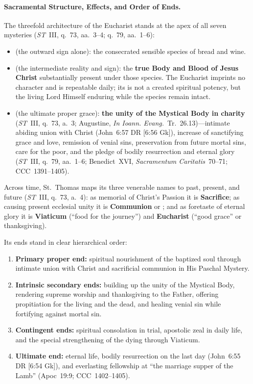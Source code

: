 \paragraph{Sacramental Structure, Effects, and Order of Ends.}
The threefold architecture of the Eucharist stands at the apex of all seven mysteries (\emph{ST}~III, q.~73, aa.~3--4; q.~79, aa.~1--6):
\begin{itemize}
  \item \textbf{} (the outward sign alone): the consecrated sensible species of bread and wine.
  \item \textbf{} (the intermediate reality and sign): the \textbf{true Body and Blood of Jesus Christ} substantially present under those species. The Eucharist imprints no character and is repeatable daily; its  is not a created spiritual potency, but the living Lord Himself enduring while the species remain intact.
  \item \textbf{} (the ultimate proper grace): \textbf{the unity of the Mystical Body in charity} (\emph{ST}~III, q.~73, a.~3; Augustine, \emph{In Ioann. Evang.}~Tr.~26.13)---intimate abiding union with Christ (John~6:57 DR [6:56 Gk]), increase of sanctifying grace and love, remission of venial sins, preservation from future mortal sins, care for the poor, and the pledge of bodily resurrection and eternal glory (\emph{ST}~III, q.~79, aa.~1--6; Benedict~XVI, \emph{Sacramentum Caritatis}~70--71; CCC~1391--1405).
\end{itemize}
Across time, St.~Thomas maps its three venerable names to past, present, and future (\emph{ST}~III, q.~73, a.~4): as memorial of Christ's Passion it is \textbf{Sacrifice}; as causing present ecclesial unity it is \textbf{Communion} or ; and as foretaste of eternal glory it is \textbf{Viaticum} (``food for the journey'') and \textbf{Eucharist} (``good grace'' or thanksgiving).

Its ends stand in clear hierarchical order:
\begin{enumerate}
  \item \textbf{Primary proper end:} spiritual nourishment of the baptized soul through intimate union with Christ and sacrificial communion in His Paschal Mystery.
  \item \textbf{Intrinsic secondary ends:} building up the unity of the Mystical Body, rendering supreme worship and thanksgiving to the Father, offering propitiation for the living and the dead, and healing venial sin while fortifying against mortal sin.
  \item \textbf{Contingent ends:} spiritual consolation in trial, apostolic zeal in daily life, and the special strengthening of the dying through Viaticum.
  \item \textbf{Ultimate end:} eternal life, bodily resurrection on the last day (John~6:55 DR [6:54 Gk]), and everlasting fellowship at ``the marriage supper of the Lamb'' (Apoc~19:9; CCC~1402--1405).
\end{enumerate}

